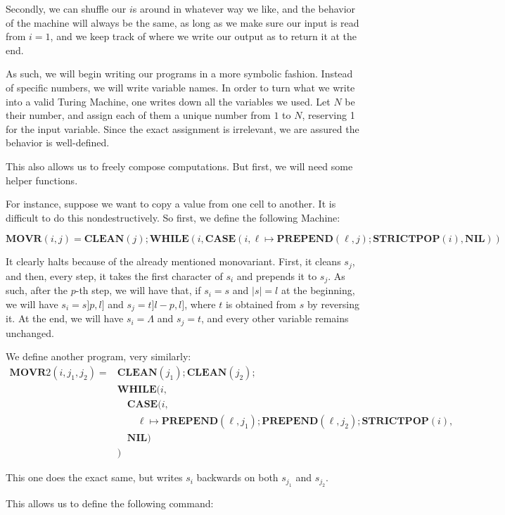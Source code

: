 \documentclass{article}
\newcommand{\NIL}{\mathbf{NIL}}
\newcommand{\PREPEND}{\mathbf{PREPEND}}
\newcommand{\STRICTPOP}{\mathbf{STRICTPOP}}
\newcommand{\CASE}{\mathbf{CASE}}
\newcommand{\WHILE}{\mathbf{WHILE}}
\newcommand{\CLEAN}{\mathbf{CLEAN}}
\newcommand{\MOVR}{\mathbf{MOVR}}
\begin{document}
	Secondly, we can shuffle our $i$s around in whatever way we like, and the behavior of the machine will always be the same, as long as we make sure our input is read from $i = 1$, and we keep track of where we write our output as to return it at the end.
	
	As such, we will begin writing our programs in a more symbolic fashion. Instead of specific numbers, we will write variable names. In order to turn what we write into a valid Turing Machine, one writes down all the variables we used. Let $N$ be their number, and assign each of them a unique number from $1$ to $N$, reserving 1 for the input variable. Since the exact assignment is irrelevant, we are assured the behavior is well-defined.
	
	This also allows us to freely compose computations. But first, we will need some helper functions.
	
	For instance, suppose we want to copy a value from one cell to another. It is difficult to do this nondestructively. So first, we define the following Machine:
	
	\[\MOVR(i, j) = \CLEAN(j);\WHILE(i, \CASE(i, \ell \mapsto \PREPEND(\ell, j); \STRICTPOP(i), \NIL))\]
	
	It clearly halts because of the already mentioned monovariant. First, it cleans $s_j$, and then, every step, it takes the first character of $s_i$ and prepends it to $s_j$. As such, after the $p$-th step, we will have that, if $s_i = s$ and $\lvert s \rvert = l$ at the beginning, we will have $s_i = s]p,l]$ and $s_j = t]l-p, l]$, where $t$ is obtained from $s$ by reversing it. At the end, we will have $s_i = \Lambda$ and $s_j = t$, and every other variable remains unchanged.
	
	We define another program, very similarly:
	\begin{align*}
	\MOVR2(i, j_1, j_2) =& \CLEAN(j_1); \CLEAN(j_2);\\
	& \WHILE(i,\\
	&\quad \CASE(i,\\
	&\quad \quad \ell \mapsto \PREPEND(\ell, j_1); \PREPEND(\ell, j_2); \STRICTPOP(i),\\
	&\quad \NIL)\\
	&)
	\end{align*}
	
	This one does the exact same, but writes $s_i$ backwards on both $s_{j_1}$ and $s_{j_2}$.
	
	This allows us to define the following command:
	
\end{document}
